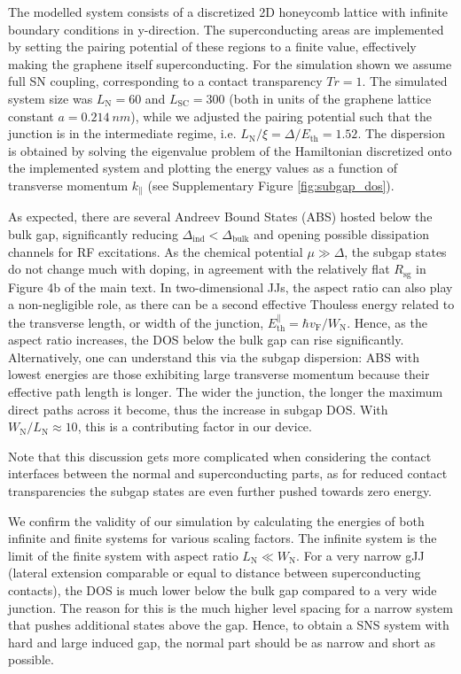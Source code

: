 The modelled system consists of a discretized 2D honeycomb lattice with infinite boundary conditions in y-direction.
The superconducting areas are implemented by setting the pairing potential of these regions to a finite value, effectively making the graphene itself superconducting.
For the simulation shown we assume full SN coupling, corresponding to a contact transparency $Tr=1$.
The simulated system size was $L_\text{N}=60$ and $L_\text{SC}=300$ (both in units of the graphene lattice constant $a=\SI{0.214}{nm}$), while we adjusted the pairing potential such that the junction is in the intermediate regime, i.e. $L_\text{N}/\xi=\Delta/E_\text{th} = 1.52$.
The dispersion is obtained by solving the eigenvalue problem of the Hamiltonian discretized onto the implemented system and plotting the energy values as a function of transverse momentum $k_\parallel$ (see Supplementary Figure \ref{fig:subgap_dos}).

As expected, there are several Andreev Bound States (ABS) hosted below the bulk gap, significantly reducing $\Delta_\text{ind}<\Delta_\text{bulk}$ and opening possible dissipation channels for RF excitations.
As the chemical potential $\mu\gg\Delta$, the subgap states do not change much with doping, in agreement with the relatively flat $R_\text{sg}$ in Figure 4b of the main text.
In two-dimensional JJs, the aspect ratio can also play a non-negligible role, as there can be a second effective Thouless energy related to the transverse length, or width of the junction, $E_\text{th}^\parallel=\hbar v_\text{F}/W_\text{N}$.
Hence, as the aspect ratio increases, the DOS below the bulk gap can rise significantly.
Alternatively, one can understand this via the subgap dispersion:
ABS with lowest energies are those exhibiting large transverse momentum because their effective path length is longer.
The wider the junction, the longer the maximum direct paths across it become, thus the increase in subgap DOS.
With $W_\text{N}/L_\text{N}\approx10$, this is a contributing factor in our device.

Note that this discussion gets more complicated when considering the contact interfaces between the normal and superconducting parts, as for reduced contact transparencies the subgap states are even further pushed towards zero energy.

We confirm the validity of our simulation by calculating the energies of both infinite and finite systems for various scaling factors.
The infinite system is the limit of the finite system with aspect ratio $L_\text{N} \ll W_\text{N}$.
For a very narrow gJJ (lateral extension comparable or equal to distance between superconducting contacts), the DOS is much lower below the bulk gap compared to a very wide junction.
The reason for this is the much higher level spacing for a narrow system that pushes additional states above the gap.
Hence, to obtain a SNS system with hard and large induced gap, the normal part should be as narrow and short as possible.

